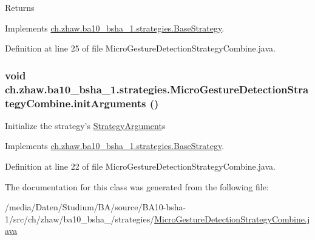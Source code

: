 \begin{DoxyReturn}{Returns}

\end{DoxyReturn}


Implements \hyperlink{classch_1_1zhaw_1_1ba10__bsha__1_1_1strategies_1_1BaseStrategy_aa0ebed55eed45409bad13d43a0058780}{ch.zhaw.ba10\_\-bsha\_\-1.strategies.BaseStrategy}.

Definition at line 25 of file MicroGestureDetectionStrategyCombine.java.\hypertarget{classch_1_1zhaw_1_1ba10__bsha__1_1_1strategies_1_1MicroGestureDetectionStrategyCombine_ab23cfbf392bc9eb213a0c8768918d9d2}{
\subsubsection[{initArguments}]{\setlength{\rightskip}{0pt plus 5cm}void ch.zhaw.ba10\_\-bsha\_\-1.strategies.MicroGestureDetectionStrategyCombine.initArguments ()}}
\label{classch_1_1zhaw_1_1ba10__bsha__1_1_1strategies_1_1MicroGestureDetectionStrategyCombine_ab23cfbf392bc9eb213a0c8768918d9d2}
Initialize the strategy's \hyperlink{classch_1_1zhaw_1_1ba10__bsha__1_1_1StrategyArgument}{StrategyArgument}s 

Implements \hyperlink{classch_1_1zhaw_1_1ba10__bsha__1_1_1strategies_1_1BaseStrategy_a0496e8fd0099a5f0f7765322d7e752a9}{ch.zhaw.ba10\_\-bsha\_\-1.strategies.BaseStrategy}.

Definition at line 22 of file MicroGestureDetectionStrategyCombine.java.

The documentation for this class was generated from the following file:\begin{DoxyCompactItemize}
\item 
/media/Daten/Studium/BA/source/BA10-\/bsha-\/1/src/ch/zhaw/ba10\_\-bsha\_/strategies/\hyperlink{MicroGestureDetectionStrategyCombine_8java}{MicroGestureDetectionStrategyCombine.java}\end{DoxyCompactItemize}
